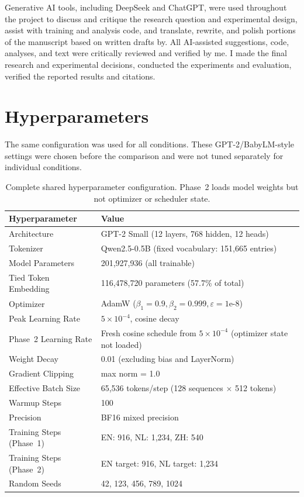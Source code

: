 \documentclass[11pt]{article}
\begin{document}
Generative AI tools, including DeepSeek and ChatGPT, were used throughout the project to discuss and critique the research question and experimental design, assist with training and analysis code, and translate, rewrite, and polish portions of the manuscript based on written drafts by. All AI-assisted suggestions, code, analyses, and text were critically reviewed and verified by me. I made the final research and experimental decisions, conducted the experiments and evaluation, verified the reported results and citations.

\setlength{\bibsep}{0pt}


\appendix

\clearpage
\raggedbottom
\section{Hyperparameters}
\label{sec:appendix-hyper}

The same configuration was used for all conditions. These GPT-2/BabyLM-style settings were chosen before the comparison and were not tuned separately for individual conditions.

\begin{table}[H]
\centering
\footnotesize
\setlength{\tabcolsep}{3pt}
\begin{tabular}{@{}p{}p{}@{}}
\hline
\textbf{Hyperparameter} & \textbf{Value} \\ \hline
Architecture & GPT-2 Small (12 layers, 768 hidden, 12 heads) \\
Tokenizer & Qwen2.5-0.5B (fixed vocabulary: 151,665 entries) \\
Model Parameters & 201,927,936 (all trainable) \\
Tied Token Embedding & 116,478,720 parameters (57.7\% of total) \\
Optimizer & AdamW ($\beta_1=0.9, \beta_2=0.999, \varepsilon=1\text{e-}8$) \\
Peak Learning Rate & $5\times10^{-4}$, cosine decay \\
Phase~2 Learning Rate & Fresh cosine schedule from $5\times10^{-4}$ (optimizer state not loaded) \\
Weight Decay & 0.01 (excluding bias and LayerNorm) \\
Gradient Clipping & max norm = 1.0 \\
Effective Batch Size & 65,536 tokens/step (128 sequences $\times$ 512 tokens) \\
Warmup Steps & 100 \\
Precision & BF16 mixed precision \\
Training Steps (Phase~1) & EN: 916, NL: 1,234, ZH: 540 \\
Training Steps (Phase~2) & EN target: 916, NL target: 1,234 \\
Random Seeds & 42, 123, 456, 789, 1024 \\ \hline
\end{tabular}
\caption{Complete shared hyperparameter configuration. Phase~2 loads model weights but not optimizer or scheduler state.}
\label{tab:hyperparameters}
\end{table}
\end{document}
